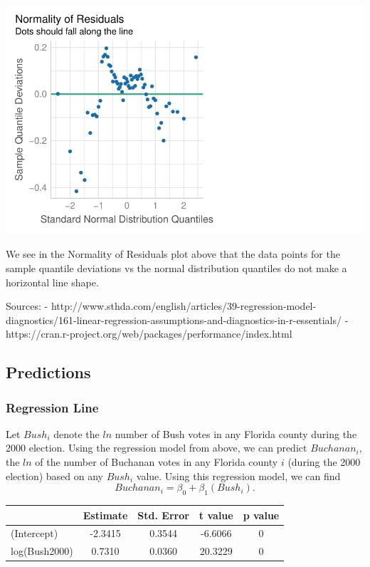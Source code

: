 \documentclass[
  letterpaper,
  DIV=11,
  numbers=noendperiod]{scrartcl}
\begin{document}
\includegraphics{sds-291_s-24_case-study-template_files/figure-pdf/unnamed-chunk-9-1.pdf}

We see in the Normality of Residuals plot above that the data points for
the sample quantile deviations vs the normal distribution quantiles do
not make a horizontal line shape.

Sources: -
http://www.sthda.com/english/articles/39-regression-model-diagnostics/161-linear-regression-assumptions-and-diagnostics-in-r-essentials/
- https://cran.r-project.org/web/packages/performance/index.html

\hypertarget{predictions}{%
\subsection{Predictions}\label{predictions}}

\hypertarget{regression-line}{%
\subsubsection{Regression Line}\label{regression-line}}

Let \(Bush_i\) denote the \(ln\) number of Bush votes in any Florida
county during the 2000 election. Using the regression model from above,
we can predict \(Buchanan_i\), the \(ln\) of the number of Buchanan
votes in any Florida county \(i\) (during the 2000 election) based on
any \(Bush_i\) value. Using this regression model, we can find
\[Buchanan_i = \beta_0 + \beta_1\left(Bush_i\right).\]

\begin{table}[H]
\centering
\begin{tabular}[t]{lcccc}
\toprule
  & Estimate & Std. Error & t value & p value\\
\midrule
(Intercept) & -2.3415 & 0.3544 & -6.6066 & 0\\
log(Bush2000) & 0.7310 & 0.0360 & 20.3229 & 0\\
\bottomrule
\end{tabular}
\end{table}
\end{document}
